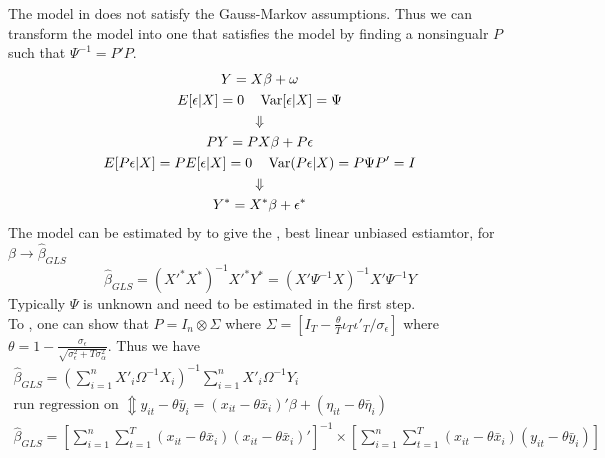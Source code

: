 The model in  does not satisfy the Gauss-Markov assumptions. 
Thus we can transform the model into one that satisfies the model by finding a nonsingualr $P$ such that $\Psi^{-1} = P'P$.
\begin{gather*}
    Y = X\beta + \omega\\
    E[\epsilon|X] = 0\quad \operatorname{Var}[\epsilon|X] = \Psi\\
    \Downarrow\\
    PY = PX\beta + P\epsilon\\
    E[P\epsilon|X] =PE[\epsilon|X]= 0\quad \operatorname{Var}(P\epsilon|X) = P\Psi P' = I\\
    \Downarrow\\
    Y^* = X^*\beta + \epsilon^*
\end{gather*}
The model can be estimated by  to give the , best linear unbiased estiamtor, for $\beta\to\hat{\beta}_{GLS}$
\begin{equation*}
    \hat{\beta}_{GLS} = (X'^* X^*)^{-1}X'^*Y^* = (X'\Psi^{-1}X)^{-1}X'\Psi^{-1}Y
\end{equation*}
Typically $\Psi$ is unknown and need to be estimated in the first step.\\

To , one can show that $P = I_n\otimes\Sigma$ where $\Sigma = \left[I_T - \frac{\theta}{T}\iota_T\iota'_T/\sigma_{\epsilon}\right]$
where $\theta = 1 - \frac{\sigma_{\epsilon}}{\sqrt{\sigma^2_{\epsilon} + T\sigma^2_{\alpha}}}$. Thus we have 
\begin{gather*}
    \hat{\beta}_{GLS} = (\sum_{i=1}^{n}X'_i\Omega^{-1}X_i)^{-1}\sum_{i=1}^{n}X'_i\Omega^{-1}Y_i\\
    \text{run regression on }\Updownarrow y_{it} - \theta \bar{y}_i = (x_{it}-\theta\bar{x}_i)'\beta + (\eta_{it} - \theta\bar{\eta}_i)\\
    \hat{\beta}_{GLS} = \left[\sum_{i=1}^{n}\sum_{t=1}^{T}(x_{it}-\theta\bar{x}_i)(x_{it}-\theta\bar{x}_i)'\right]^{-1}\times \left[\sum_{i=1}^{n}\sum_{t=1}^{T}(x_{it}-\theta\bar{x}_i)(y_{it}-\theta\bar{y}_i)\right]
\end{gather*}

